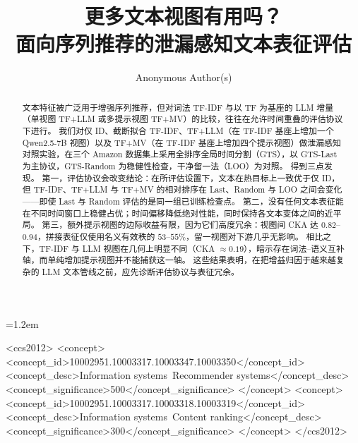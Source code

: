 \documentclass[sigconf,natbib=true,anonymous]{acmart}
\newcommand{\tfidf}{\textsc{TF-IDF}\xspace}
\newcommand{\tfllm}{\textsc{TF+LLM}\xspace}
\newcommand{\tfmv}{\textsc{TF+MV}\xspace}
\begin{document}
\emergencystretch=1.2em

\title{更多文本视图有用吗？\\
面向序列推荐的泄漏感知文本表征评估}

\author{Anonymous Author(s)}
\renewcommand{\shortauthors}{Anonymous}

\begin{abstract}
文本特征被广泛用于增强序列推荐，但对词法 \tfidf 与以 TF 为基座的 LLM 增量（单视图 \tfllm 或多提示视图 \tfmv）的比较，往往在允许时间重叠的评估协议下进行。
我们对仅 ID、截断拟合 \tfidf、\tfllm（在 \tfidf 基座上增加一个 Qwen2.5-7B 视图）以及 \tfmv（在 \tfidf 基座上增加四个提示视图）做泄漏感知对照实验，在三个 Amazon 数据集上采用全排序全局时间分割（GTS），以 GTS-Last 为主协议，GTS-Random 为稳健性检查，干净留一法（LOO）为对照。
得到三点发现。
第一，评估协议会改变结论：在所评估设置下，文本在热目标上一致优于仅 ID，但 \tfidf、\tfllm 与 \tfmv 的相对排序在 Last、Random 与 LOO 之间会变化——即使 Last 与 Random 评估的是同一组已训练检查点。
第二，没有任何文本表征能在不同时间窗口上稳健占优；时间偏移降低绝对性能，同时保持各文本变体之间的近平局。
第三，额外提示视图的边际收益有限，因为它们高度冗余：视图间 CKA 达 $0.82$--$0.94$，拼接表征仅使用名义有效秩的 $53$--$55\%$，留一视图对下游几乎无影响。
相比之下，TF-IDF 与 LLM 视图在几何上明显不同（CKA $\approx 0.19$），暗示存在词法--语义互补轴，而单纯增加提示视图并不能捕获这一轴。
这些结果表明，在把增益归因于越来越复杂的 LLM 文本管线之前，应先诊断评估协议与表征冗余。
\end{abstract}

\begin{CCSXML}
<ccs2012>
 <concept>
  <concept_id>10002951.10003317.10003347.10003350</concept_id>
  <concept_desc>Information systems~Recommender systems</concept_desc>
  <concept_significance>500</concept_significance>
 </concept>
 <concept>
  <concept_id>10002951.10003317.10003318.10003319</concept_id>
  <concept_desc>Information systems~Content ranking</concept_desc>
  <concept_significance>300</concept_significance>
 </concept>
</ccs2012>
\end{CCSXML}

\end{document}
